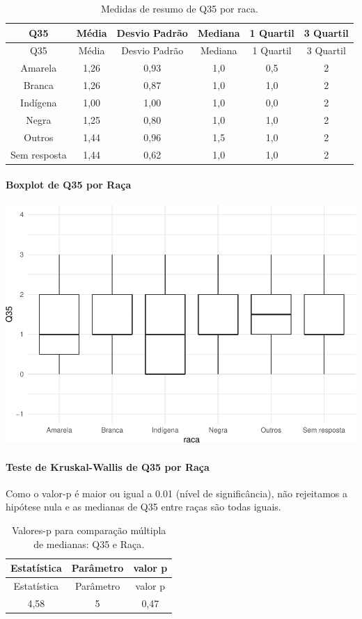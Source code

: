 \documentclass[]{article}
\let\oldparagraph\paragraph
\renewcommand{\paragraph}[1]{\oldparagraph{#1}\mbox{}}
\begin{document}
\begin{longtable}[]{@{}cccccc@{}}
\caption{\label{tab:unnamed-chunk-1285}Medidas de resumo de Q35 por raca.}\tabularnewline
\toprule
Q35 & Média & Desvio Padrão & Mediana & 1 Quartil & 3 Quartil\tabularnewline
\midrule
\endfirsthead
\toprule
Q35 & Média & Desvio Padrão & Mediana & 1 Quartil & 3 Quartil\tabularnewline
\midrule
\endhead
Amarela & 1,26 & 0,93 & 1,0 & 0,5 & 2\tabularnewline
Branca & 1,26 & 0,87 & 1,0 & 1,0 & 2\tabularnewline
Indígena & 1,00 & 1,00 & 1,0 & 0,0 & 2\tabularnewline
Negra & 1,25 & 0,80 & 1,0 & 1,0 & 2\tabularnewline
Outros & 1,44 & 0,96 & 1,5 & 1,0 & 2\tabularnewline
Sem resposta & 1,44 & 0,62 & 1,0 & 1,0 & 2\tabularnewline
\bottomrule
\end{longtable}

\hypertarget{boxplot-de-q35-por-rauxe7a}{%
\paragraph{Boxplot de Q35 por Raça}\label{boxplot-de-q35-por-rauxe7a}}

\begin{center}\includegraphics[width=0.75\linewidth]{relatorio_covid19_files/figure-latex/unnamed-chunk-1286-1} \end{center}

\hypertarget{teste-de-kruskal-wallis-de-q35-por-rauxe7a}{%
\paragraph{Teste de Kruskal-Wallis de Q35 por Raça}\label{teste-de-kruskal-wallis-de-q35-por-rauxe7a}}

Como o valor-p é maior ou igual a 0.01 (nível de significância), não rejeitamos a hipótese nula e as medianas de Q35 entre raças são todas iguais.

\begin{longtable}[]{@{}ccc@{}}
\caption{\label{tab:unnamed-chunk-1288}Valores-p para comparação múltipla de medianas: Q35 e Raça.}\tabularnewline
\toprule
Estatística & Parâmetro & valor p\tabularnewline
\midrule
\endfirsthead
\toprule
Estatística & Parâmetro & valor p\tabularnewline
\midrule
\endhead
4,58 & 5 & 0,47\tabularnewline
\bottomrule
\end{longtable}
\end{document}
